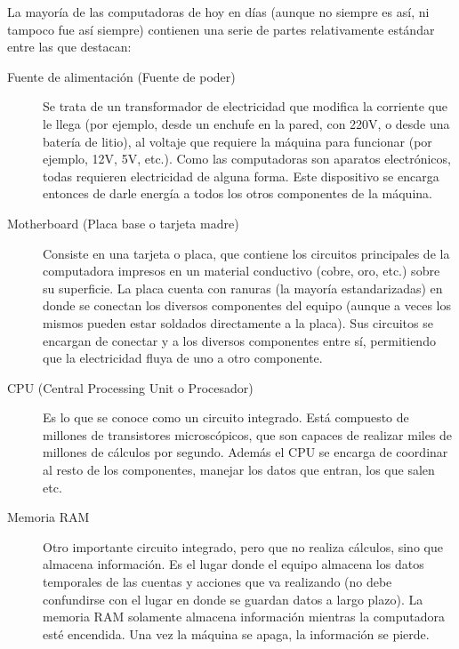 La mayoría de las computadoras de hoy en días (aunque no siempre es así, ni
tampoco fue así siempre) contienen una serie de partes relativamente estándar
 entre las que destacan:
\begin{description}
    \item[Fuente de alimentación (Fuente de poder)]
        Se trata de un transformador de electricidad que modifica la corriente
        que le llega (por ejemplo, desde un enchufe en la pared, con 220V, o
        desde una batería de litio), al voltaje que requiere la máquina para
        funcionar (por ejemplo, 12V, 5V, etc.). Como las computadoras son
        aparatos electrónicos, todas requieren electricidad de alguna forma.
        Este dispositivo se encarga entonces de darle energía a todos los otros
        componentes de la máquina.
    \item[Motherboard (Placa base o tarjeta madre)]
        Consiste en una tarjeta o placa, que contiene los circuitos principales
        de la computadora impresos en un material conductivo (cobre, oro, etc.)
        sobre su superficie. La placa cuenta con ranuras (la mayoría
        estandarizadas) en donde se conectan los diversos componentes del
        equipo (aunque a veces los mismos pueden estar soldados directamente
        a la placa). Sus circuitos se encargan de conectar y a los diversos
        componentes entre sí, permitiendo que la electricidad fluya de uno a
        otro componente.
    \item[CPU (Central Processing Unit o Procesador)]
        Es lo que se conoce como un circuito integrado. Está compuesto de
        millones de transistores microscópicos, que son capaces de realizar
        miles de millones de cálculos por segundo. Además el CPU se encarga de coordinar
        al resto de los componentes, manejar los datos que entran, los que salen
        etc.
    \item[Memoria RAM]
        Otro importante circuito integrado, pero que no realiza cálculos, sino
        que almacena información. Es el lugar donde el equipo almacena los datos
        temporales de las cuentas y acciones que va realizando (no debe
        confundirse con el lugar en donde se guardan datos a largo plazo). La
        memoria RAM solamente almacena información mientras la computadora esté
        encendida. Una vez la máquina se apaga, la información se pierde.
\end{description}

